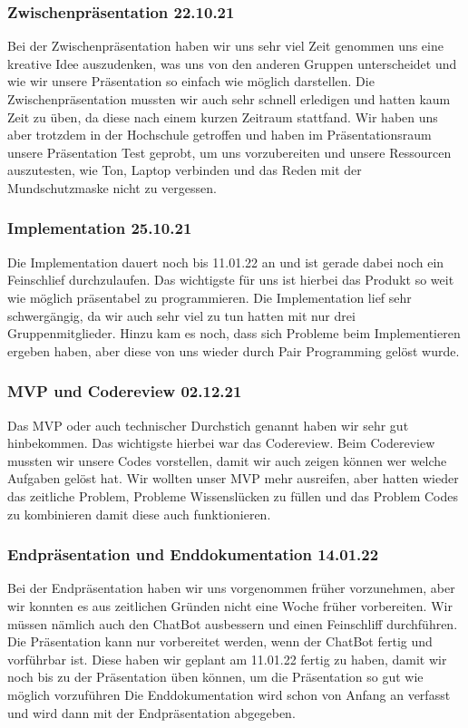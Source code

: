 \subsubsection{Zwischenpräsentation 22.10.21}
Bei der Zwischenpräsentation haben wir uns sehr viel Zeit genommen uns eine kreative Idee auszudenken, 
was uns von den anderen Gruppen unterscheidet und wie wir unsere Präsentation so einfach wie möglich darstellen. 
Die Zwischenpräsentation mussten wir auch sehr schnell erledigen und hatten kaum Zeit zu üben, da diese nach einem kurzen Zeitraum stattfand. 
Wir haben uns aber trotzdem in der Hochschule getroffen und haben im Präsentationsraum unsere Präsentation Test geprobt, 
um uns vorzubereiten und unsere Ressourcen auszutesten, wie Ton, Laptop verbinden und das Reden mit der Mundschutzmaske nicht zu vergessen.

\subsubsection{Implementation 25.10.21}
Die Implementation dauert noch bis 11.01.22 an und ist gerade dabei noch ein Feinschlief durchzulaufen. 
Das wichtigste für uns ist hierbei das Produkt so weit wie möglich präsentabel zu programmieren. 
Die Implementation lief sehr schwergängig, da wir auch sehr viel zu tun hatten mit nur drei Gruppenmitglieder. 
Hinzu kam es noch, dass sich Probleme beim Implementieren ergeben haben, aber diese von uns wieder durch Pair Programming gelöst wurde. 

\subsubsection{MVP und Codereview 02.12.21}
Das MVP oder auch technischer Durchstich genannt haben wir sehr gut hinbekommen. 
Das wichtigste hierbei war das Codereview. Beim Codereview mussten wir unsere Codes vorstellen, damit wir auch zeigen können wer welche Aufgaben gelöst hat. 
Wir wollten unser MVP mehr ausreifen, aber hatten wieder das zeitliche Problem, Probleme Wissenslücken zu füllen und das Problem Codes zu kombinieren damit diese auch funktionieren. 

\subsubsection{Endpräsentation und Enddokumentation 14.01.22}
Bei der Endpräsentation haben wir uns vorgenommen früher vorzunehmen, aber wir konnten es aus zeitlichen Gründen nicht eine Woche früher vorbereiten.
Wir müssen nämlich auch den ChatBot ausbessern und einen Feinschliff durchführen. Die Präsentation kann nur vorbereitet werden, wenn der ChatBot fertig und vorführbar ist. 
Diese haben wir geplant am 11.01.22 fertig zu haben, damit wir noch bis zu der Präsentation üben können,
um die Präsentation so gut wie möglich vorzuführen
Die Enddokumentation wird schon von Anfang an verfasst und wird dann mit der Endpräsentation abgegeben.